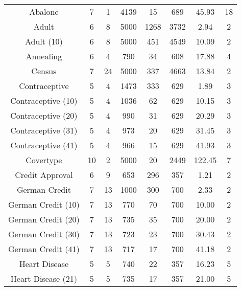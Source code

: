 \begin{longtable}{cccccccc}
\bottomrule
\endlastfoot
           Abalone &       7 &           1 &  4139 &         15 &        689 &  45.93 &       18 \\
             Adult &       6 &           8 &  5000 &       1268 &       3732 &   2.94 &        2 \\
        Adult (10) &       6 &           8 &  5000 &        451 &       4549 &  10.09 &        2 \\
         Annealing &       6 &           4 &   790 &         34 &        608 &  17.88 &        4 \\
            Census &       7 &          24 &  5000 &        337 &       4663 &  13.84 &        2 \\
     Contraceptive &       5 &           4 &  1473 &        333 &        629 &   1.89 &        3 \\
Contraceptive (10) &       5 &           4 &  1036 &         62 &        629 &  10.15 &        3 \\
Contraceptive (20) &       5 &           4 &   990 &         31 &        629 &  20.29 &        3 \\
Contraceptive (31) &       5 &           4 &   973 &         20 &        629 &  31.45 &        3 \\
Contraceptive (41) &       5 &           4 &   966 &         15 &        629 &  41.93 &        3 \\
         Covertype &      10 &           2 &  5000 &         20 &       2449 & 122.45 &        7 \\
   Credit Approval &       6 &           9 &   653 &        296 &        357 &   1.21 &        2 \\
     German Credit &       7 &          13 &  1000 &        300 &        700 &   2.33 &        2 \\
German Credit (10) &       7 &          13 &   770 &         70 &        700 &  10.00 &        2 \\
German Credit (20) &       7 &          13 &   735 &         35 &        700 &  20.00 &        2 \\
German Credit (30) &       7 &          13 &   723 &         23 &        700 &  30.43 &        2 \\
German Credit (41) &       7 &          13 &   717 &         17 &        700 &  41.18 &        2 \\
     Heart Disease &       5 &           5 &   740 &         22 &        357 &  16.23 &        5 \\
Heart Disease (21) &       5 &           5 &   735 &         17 &        357 &  21.00 &        5 \\
\end{longtable}
